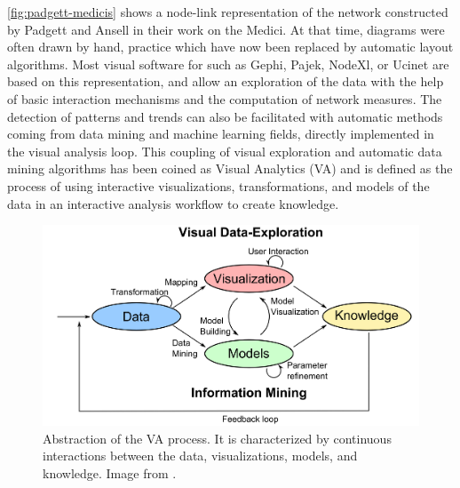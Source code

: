 \autoref{fig:padgett-medicis} shows a node-link representation of the network constructed by Padgett and Ansell in their work on the Medici.
At that time, diagrams were often drawn by hand, practice which have now been replaced by automatic layout algorithms.
Most visual software for \sna such as Gephi\cite{Gephi}, Pajek\cite{pajek}, NodeXl\cite{NodeXL}, or Ucinet\cite{ucinet} are based on this representation, and allow an exploration of the data with the help of basic interaction mechanisms and the computation of network measures.
The detection of patterns and trends can also be facilitated with automatic methods coming from data mining and machine learning fields, directly implemented in the visual analysis loop.
This coupling of visual exploration and automatic data mining algorithms has been coined as Visual Analytics (VA) and is defined as the process of using interactive visualizations, transformations, and models of the data in an interactive analysis workflow to create knowledge\cite{keimVisualAnalyticsDefinition2008}.

\begin{figure}[!ht]
    \centering %
    \includegraphics[width=1\textwidth]{static/figures/RelatedWork/Keim-VisualAnalytics.png}
    \caption{Abstraction of the VA process. It is characterized by continuous interactions between the data, visualizations, models, and knowledge. Image from \cite{keimVisualAnalyticsDefinition2008}.}
    \label{fig:keim-va}
\end{figure}

